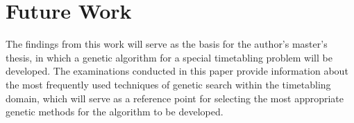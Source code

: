 \documentclass[sigconf]{acmart}
\begin{document}
\section{Future Work}
The findings from this work will serve as the basis for the author's master's
thesis, in which a genetic algorithm for a special timetabling problem will be
developed.
The examinations conducted in this paper provide information about the most
frequently used techniques of genetic search within the timetabling domain,
which will serve as a reference point for selecting the most appropriate
genetic methods for the algorithm to be developed.









\end{document}
